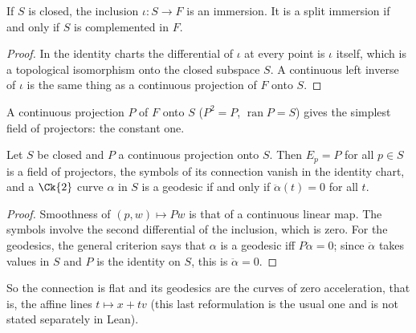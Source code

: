 \begin{proposition}
  \label{prop:ex-subspace-immersion}
  \leanok
  If $S$ is closed, the inclusion $\iota \colon S \to F$ is an immersion. It is a split
  immersion if and only if $S$ is complemented in $F$.
\end{proposition}

\begin{proof}
  \leanok
  In the identity charts the differential of $\iota$ at every point is $\iota$ itself, which is
  a topological isomorphism onto the closed subspace $S$. A continuous left inverse of $\iota$
  is the same thing as a continuous projection of $F$ onto $S$.
\end{proof}

A continuous projection $P$ of $F$ onto $S$ ($P^2 = P$, $\operatorname{ran} P = S$) gives the
simplest field of projectors: the constant one.

\begin{proposition}
  \label{prop:ex-subspace-flat}
  \leanok
  Let $S$ be closed and $P$ a continuous projection onto $S$. Then $E_p = P$ for all $p \in S$
  is a field of projectors, the symbols of its connection vanish in the identity chart, and a
  $\Ck{2}$ curve $\alpha$ in $S$ is a geodesic if and only if $\ddot\alpha(t) = 0$ for all $t$.
\end{proposition}

\begin{proof}
  \leanok
  Smoothness of $(p, w) \mapsto P w$ is that of a continuous linear map. The symbols involve the
  second differential of the inclusion, which is zero. For the geodesics, the general criterion
  says that $\alpha$ is a geodesic iff $P\ddot\alpha = 0$; since $\ddot\alpha$ takes values in
  $S$ and $P$ is the identity on $S$, this is $\ddot\alpha = 0$.
\end{proof}

So the connection is flat and its geodesics are the curves of zero acceleration, that is, the
affine lines $t \mapsto x + t v$ (this last reformulation is the usual one and is not stated
separately in Lean).

